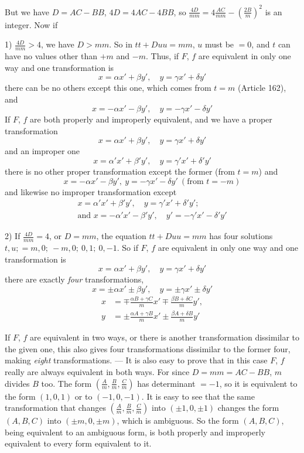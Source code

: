 But we have $D=AC-BB$, $4D=4AC-4BB$, so $\frac{4D}{mm}=4\frac{AC}{mm}-(\frac{2B}{m})^2$ is an integer. Now if

1) $\frac{4D}{mm}>4$, we have $D>mm$. So in $tt+Duu=mm$, $u$ must be $=0$, and $t$ can have no values other than $+m$ and $-m$. Thus,
if $F$, $f$ are equivalent in only one way and one transformation is
\[
x=\alpha x'+\beta y',\quad y=\gamma x'+\delta y'
\]
there can be no others except this one, which comes from $t=m$ (Article 162), and
\[
x=-\alpha x'-\beta y',\quad y=-\gamma x'-\delta y'
\]
If $F$, $f$ are both properly and improperly equivalent, and we have a proper transformation
\[
x=\alpha x'+\beta y',\quad y=\gamma x'+\delta y'
\]
and an improper one
\[
x=\alpha'x'+\beta'y',\quad y=\gamma'x'+\delta'y'
\]
there is no other proper transformation except the former (from $t=m$) and
\[
x=-\alpha x'-\beta y',\ y=-\gamma x'-\delta y'\ (\text{from }t=-m)
\]
and likewise no improper transformation except
\[
\begin{gathered}
x=\alpha'x'+\beta'y',\quad y=\gamma'x'+\delta'y';\\
\text{and }x=-\alpha'x'-\beta'y',\quad y'=-\gamma'x'-\delta'y'
\end{gathered}
\]

2) If $\frac{4D}{mm}=4$, or $D=mm$, the equation $tt+Duu=mm$ has four solutions $t,u;=m,0;\ -m,0;\ 0,1;\ 0,-1$. So if $F$, $f$ are equivalent in only one way and one transformation is
\[
x=\alpha x'+\beta y',\quad y=\gamma x'+\delta y'
\]
there are exactly \emph{four} transformations,
\[
x=\pm\alpha x'\pm\beta y',\quad y=\pm\gamma x'\pm\delta y'
\]
\[
\begin{aligned}
x&=\mp\frac{\alpha B+\gamma C}{m}x'\mp\frac{\beta B+\delta C}{m}y',\\
y&=\pm\frac{\alpha A+\gamma B}{m}x'\pm\frac{\beta A+\delta B}{m}y'
\end{aligned}
\]

If $F$, $f$ are equivalent in two ways, or there is another transformation dissimilar to the given one, this also gives four transformations dissimilar to the former four, making \emph{eight} transformations. --- It is also easy to prove that in this case $F$, $f$ really are always equivalent in both ways. For since $D=mm=AC-BB$, $m$ divides $B$ too. The form $(\frac{A}{m},\frac{B}{m},\frac{C}{m})$ has determinant $=-1$, so it is equivalent to the form $(1,0,1)$ or to $(-1,0,-1)$.
It is easy to see that the same transformation that changes $(\frac{A}{m},\frac{B}{m},\frac{C}{m})$ into $(\pm1,0,\pm1)$ changes the form $(A,B,C)$ into $(\pm m,0,\pm m)$, which is ambiguous. So the form $(A,B,C)$, being equivalent to an ambiguous form, is both properly and improperly equivalent to every form equivalent to it.

